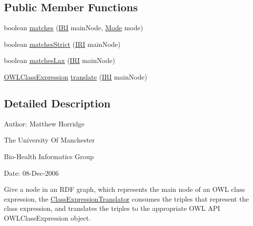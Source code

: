 \subsection*{Public Member Functions}
\begin{DoxyCompactItemize}
\item 
boolean \hyperlink{interfaceorg_1_1coode_1_1owlapi_1_1rdfxml_1_1parser_1_1_class_expression_translator_ab0aef277202661fcad2468d252068c50}{matches} (\hyperlink{classorg_1_1semanticweb_1_1owlapi_1_1model_1_1_i_r_i}{I\-R\-I} main\-Node, \hyperlink{enumorg_1_1coode_1_1owlapi_1_1rdfxml_1_1parser_1_1_mode}{Mode} mode)
\item 
boolean \hyperlink{interfaceorg_1_1coode_1_1owlapi_1_1rdfxml_1_1parser_1_1_class_expression_translator_a8dc7c5790676c122d9e098bbaf0cc7f4}{matches\-Strict} (\hyperlink{classorg_1_1semanticweb_1_1owlapi_1_1model_1_1_i_r_i}{I\-R\-I} main\-Node)
\item 
boolean \hyperlink{interfaceorg_1_1coode_1_1owlapi_1_1rdfxml_1_1parser_1_1_class_expression_translator_a38fd8ff461edd495667a09bdb9b6ce32}{matches\-Lax} (\hyperlink{classorg_1_1semanticweb_1_1owlapi_1_1model_1_1_i_r_i}{I\-R\-I} main\-Node)
\item 
\hyperlink{interfaceorg_1_1semanticweb_1_1owlapi_1_1model_1_1_o_w_l_class_expression}{O\-W\-L\-Class\-Expression} \hyperlink{interfaceorg_1_1coode_1_1owlapi_1_1rdfxml_1_1parser_1_1_class_expression_translator_a26b37c577603249ede1a65e79735f2e5}{translate} (\hyperlink{classorg_1_1semanticweb_1_1owlapi_1_1model_1_1_i_r_i}{I\-R\-I} main\-Node)
\end{DoxyCompactItemize}


\subsection{Detailed Description}
Author\-: Matthew Horridge\par
 The University Of Manchester\par
 Bio-\/\-Health Informatics Group\par
 Date\-: 08-\/\-Dec-\/2006\par
\par


Give a node in an R\-D\-F graph, which represents the main node of an O\-W\-L class expression, the {\ttfamily \hyperlink{interfaceorg_1_1coode_1_1owlapi_1_1rdfxml_1_1parser_1_1_class_expression_translator}{Class\-Expression\-Translator}} consumes the triples that represent the class expression, and translates the triples to the appropriate O\-W\-L A\-P\-I {\ttfamily O\-W\-L\-Class\-Expression} object. 

